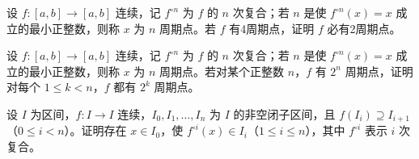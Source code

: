 \noindent\begin{minipage}{\textwidth}
设 $f:[a,b]\to[a,b]$ 连续，记 $f^{\circ n}$ 为 $f$ 的 $n$ 次复合；若 $n$ 是使 $f^{\circ n}(x)=x$ 成立的最小正整数，则称 $x$ 为 $n$ 周期点。若 $f$ 有4周期点，证明 $f$ 必有2周期点。
\end{minipage}\par\vfill
\noindent\begin{minipage}{\textwidth}
设 $f:[a,b]\to[a,b]$ 连续，记 $f^{\circ n}$ 为 $f$ 的 $n$ 次复合；若 $n$ 是使 $f^{\circ n}(x)=x$ 成立的最小正整数，则称 $x$ 为 $n$ 周期点。若对某个正整数 $n$，$f$ 有 $2^n$ 周期点，证明对每个 $1\le k<n$，$f$ 都有 $2^k$ 周期点。
\end{minipage}\par\vfill
\newpage
\noindent\begin{minipage}{\textwidth}
设 $I$ 为区间，$f:I\to I$ 连续，$I_0,I_1,\ldots,I_n$ 为 $I$ 的非空闭子区间，且 $f(I_i)\supseteq I_{i+1}$（$0\le i<n$）。证明存在 $x\in I_0$，使 $f^{\circ i}(x)\in I_i$（$1\le i\le n$），其中 $f^{\circ i}$ 表示 $i$ 次复合。
\end{minipage}\par\vfill
